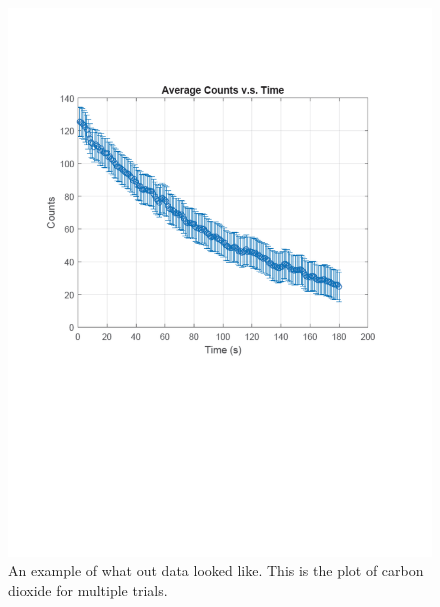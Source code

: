 \documentclass[11pt,letterpaper,onecolumn]{article}
\begin{document}
\begin{figure}[H]
 \begin{center}
 \includegraphics*[scale = .6]{count.pdf}
 \caption{An example of what out data looked like. This is the plot of carbon dioxide for multiple trials.\label{fig:Counts} }
 \end{center}
\end{figure}
 
\end{document}
